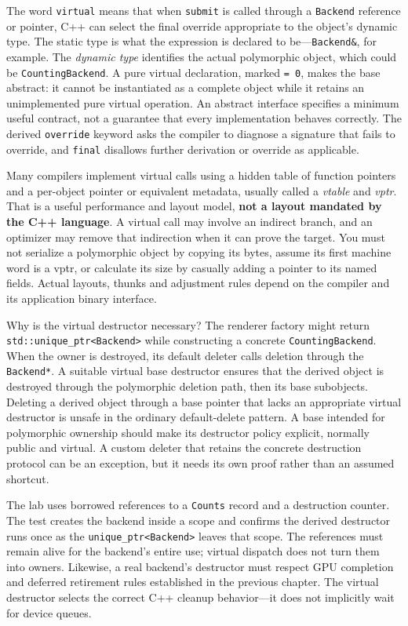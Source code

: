 The word \texttt{virtual} means that when \texttt{submit} is called through a \texttt{Backend} reference or pointer, C++ can select the final override appropriate to the object's dynamic type. The static type is what the expression is declared to be---\texttt{Backend\&}, for example. The \emph{dynamic type} identifies the actual polymorphic object, which could be \texttt{CountingBackend}. A pure virtual declaration, marked \texttt{=\ 0}, makes the base abstract: it cannot be instantiated as a complete object while it retains an unimplemented pure virtual operation. An abstract interface specifies a minimum useful contract, not a guarantee that every implementation behaves correctly. The derived \texttt{override} keyword asks the compiler to diagnose a signature that fails to override, and \texttt{final} disallows further derivation or override as applicable.

Many compilers implement virtual calls using a hidden table of function pointers and a per-object pointer or equivalent metadata, usually called a \emph{vtable} and \emph{vptr}. That is a useful performance and layout model, \textbf{not a layout mandated by the C++ language}. A virtual call may involve an indirect branch, and an optimizer may remove that indirection when it can prove the target. You must not serialize a polymorphic object by copying its bytes, assume its first machine word is a vptr, or calculate its size by casually adding a pointer to its named fields. Actual layouts, thunks and adjustment rules depend on the compiler and its application binary interface.

Why is the virtual destructor necessary? The renderer factory might return \texttt{std::unique\_ptr\textless{}Backend\textgreater{}} while constructing a concrete \texttt{CountingBackend}. When the owner is destroyed, its default deleter calls deletion through the \texttt{Backend*}. A suitable virtual base destructor ensures that the derived object is destroyed through the polymorphic deletion path, then its base subobjects. Deleting a derived object through a base pointer that lacks an appropriate virtual destructor is unsafe in the ordinary default-delete pattern. A base intended for polymorphic ownership should make its destructor policy explicit, normally public and virtual. A custom deleter that retains the concrete destruction protocol can be an exception, but it needs its own proof rather than an assumed shortcut.

The lab uses borrowed references to a \texttt{Counts} record and a destruction counter. The test creates the backend inside a scope and confirms the derived destructor runs once as the \texttt{unique\_ptr\textless{}Backend\textgreater{}} leaves that scope. The references must remain alive for the backend's entire use; virtual dispatch does not turn them into owners. Likewise, a real backend's destructor must respect GPU completion and deferred retirement rules established in the previous chapter. The virtual destructor selects the correct C++ cleanup behavior---it does not implicitly wait for device queues.

